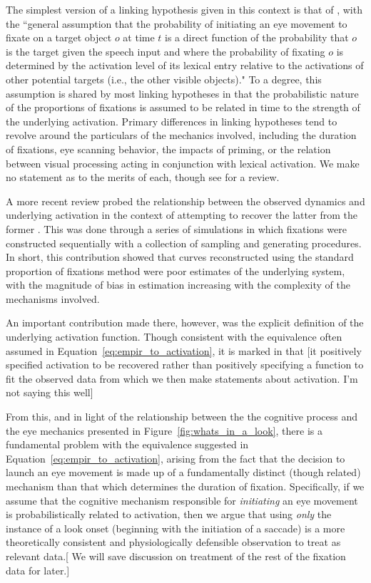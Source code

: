 \documentclass{article}
\begin{document}
The simplest version of a linking hypothesis given in this context is that of \cite{allopenna1998tracking}, with  the ``general assumption that the probability of initiating an eye movement to fixate on a target object $o$ at time $t$ is a direct function of the probability that $o$ is the target given the speech input and where the probability of fixating $o$ is determined by the activation level of its lexical entry relative to the activations of other potential targets (i.e., the other visible objects)." To a degree, this assumption is shared by most linking hypotheses in that the probabilistic nature of the proportions of fixations is assumed to be related in time to the strength of the underlying activation. Primary differences in linking hypotheses tend to revolve around the particulars of the mechanics involved, including the duration of fixations, eye scanning behavior, the impacts of priming, or the relation between visual  processing acting in conjunction with lexical activation. We make no statement as to the merits of each, though see \cite{Magnuson2019} for a review.

A more recent review probed the relationship between the observed dynamics and underlying activation in the context of attempting to recover the latter from the former \cite{mcmurray2022m}. This was done through a series of simulations in which fixations were constructed sequentially with a collection of sampling and generating procedures. In short, this contribution showed that curves reconstructed using the standard proportion of fixations method were poor estimates of the underlying system, with the magnitude of bias in estimation increasing with the complexity of the mechanisms involved.

An important contribution made there, however, was the explicit definition of the underlying activation function. Though consistent with the equivalence often assumed in Equation~\ref{eq:empir_to_activation}, it is marked in that [it positively specified activation to be recovered rather than positively specifying a function to fit the observed data from which we then make statements about activation. I'm not saying this well]

From this, and in light of the relationship between the the cognitive process and the eye mechanics presented in Figure~\ref{fig:whats_in_a_look}, there is a fundamental problem with the equivalence suggested in Equation~\ref{eq:empir_to_activation}, arising from the fact that the decision to launch an eye movement is made up of a fundamentally distinct (though related) mechanism than that which determines the duration of fixation. Specifically, if we assume that the cognitive mechanism responsible for \textit{initiating} an eye movement is probabilistically related to activation, then we argue that using \textit{only} the instance of a look onset (beginning with the initiation of a saccade) is a more theoretically consistent and physiologically defensible observation to treat as relevant data.[ We will save discussion on treatment of the rest of the fixation data for later.]
\end{document}
